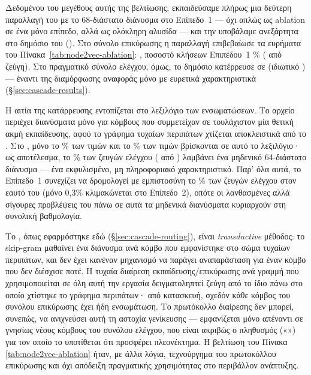 Δεδομένου του μεγέθους αυτής της βελτίωσης, εκπαιδεύσαμε πλήρως μια δεύτερη
παραλλαγή του  με το 68-διάστατο διάνυσμα στο Επίπεδο~1 --- όχι απλώς
ως ablation σε ένα μόνο επίπεδο, αλλά ως ολόκληρη αλυσίδα --- και την υποβάλαμε
ανεξάρτητα στο δημόσιο  του 
(\texttt{}).
Στο σύνολο επικύρωσης η παραλλαγή
επιβεβαίωσε τα ευρήματα του Πίνακα~\ref{tab:node2vec-ablation}: 
\NTwoVWithConfFone{}, ποσοστό κλήσεων Επιπέδου~1 \NTwoVWithCallPct\% (\NTwoVWithCallN{} από \ValSplitSize{} ζεύγη).
Στο
πραγματικό σύνολο ελέγχου, όμως, το δημόσιο  κατέρρευσε σε \NTwoVKagglePublic{}
(ιδιωτικό \NTwoVKagglePrivate{}) --- έναντι \KaggleBaselinePublic{} της διαμόρφωσης αναφοράς μόνο με ευρετικά
χαρακτηριστικά (\S\ref{sec:cascade-results}).

Η αιτία της κατάρρευσης εντοπίζεται στο λεξιλόγιο των ενσωματώσεων.
Το αρχείο
\texttt{} περιέχει διανύσματα μόνο για κόμβους που συμμετείχαν σε
τουλάχιστον μία θετική ακμή εκπαίδευσης, αφού το γράφημα τυχαίων περιπάτων χτίζεται
αποκλειστικά από το \texttt{}.
Στο \texttt{}, μόνο το
\NTwoVIdOneCoverage\% των τιμών \texttt{} και το \NTwoVIdTwoCoverage\% των τιμών \texttt{}
βρίσκονται σε αυτό το λεξιλόγιο· ως αποτέλεσμα, το \NTwoVZeroVecPct\% των ζευγών ελέγχου
(\NTwoVZeroVecN{} από \TestPairs{}) λαμβάνει ένα μηδενικό 64-διάστατο διάνυσμα  ---
ένα εκφυλισμένο, μη πληροφοριακό χαρακτηριστικό.
Παρ' όλα αυτά, το Επίπεδο~1
συνεχίζει να δρομολογεί με εμπιστοσύνη το \NTwoVTestTierOnePct\% των ζευγών ελέγχου στον εαυτό
του (μόνο 0{,}3\% κλιμακώνεται στο Επίπεδο~2), οπότε οι λανθασμένες αλλά σίγουρες
προβλέψεις του πάνω σε αυτά τα μηδενικά διανύσματα κυριαρχούν στη συνολική
βαθμολογία.

Το , όπως εφαρμόστηκε εδώ (\S\ref{sec:cascade-routing}), είναι
\textit{transductive} μέθοδος: το  skip-gram μαθαίνει ένα διάνυσμα ανά
κόμβο που εμφανίστηκε στο σώμα τυχαίων περιπάτων, και δεν έχει κανέναν μηχανισμό να
παράγει αναπαράσταση για έναν κόμβο που δεν διέσχισε ποτέ.
Η τυχαία διαίρεση
εκπαίδευσης/επικύρωσης ανά γραμμή που χρησιμοποιείται σε όλη αυτή την εργασία
δειγματοληπτεί ζεύγη από το ίδιο \texttt{} πάνω στο οποίο χτίστηκε το
γράφημα περιπάτων· από κατασκευή, σχεδόν κάθε κόμβος του συνόλου επικύρωσης έχει ήδη
ενσωμάτωση.
Το πρωτόκολλο διαίρεσης δεν μπορεί, συνεπώς, να ανιχνεύσει αυτή τη
αστοχία γενίκευσης --- εμφανίζεται μόνο απέναντι σε γνησίως νέους κόμβους του
συνόλου ελέγχου, που είναι ακριβώς ο πληθυσμός («») για τον
οποίο το  υποτίθεται ότι προσφέρει πλεονέκτημα.
Η βελτίωση του Πίνακα~
\ref{tab:node2vec-ablation} ήταν, με άλλα λόγια, τεχνούργημα του πρωτοκόλλου
επικύρωσης και όχι απόδειξη πραγματικής χρησιμότητας στο περιβάλλον ανάπτυξης.

